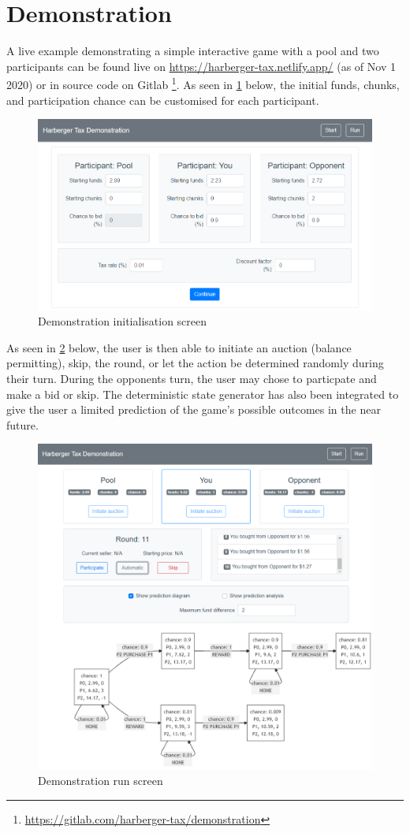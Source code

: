 \section{Demonstration} \label{section:demonstration}

A live example demonstrating a simple interactive game with a pool and two participants can be found live on \url{https://harberger-tax.netlify.app/} (as of Nov 1 2020) or in source code on Gitlab \footnote{\url{https://gitlab.com/harberger-tax/demonstration}}. As seen in \cref{figure:demonstration-start} below, the initial funds, chunks, and participation chance can be customised for each participant.

\begin{figure}[H]
  \centering
  \caption{Demonstration initialisation screen}
  \label{figure:demonstration-start}
  \includegraphics[width=\textwidth]{media/demonstration-start.PNG}
\end{figure}

As seen in \cref{figure:demonstration-run} below, the user is then able to initiate an auction (balance permitting), skip, the round, or let the action be determined randomly during their turn. During the opponents turn, the user may chose to particpate and make a bid or skip. The deterministic state generator has also been integrated to give the user a limited prediction of the game's possible outcomes in the near future.

\begin{figure}[H]
  \centering
  \caption{Demonstration run screen}
  \label{figure:demonstration-run}
  \includegraphics[width=\textwidth]{media/demonstration-run.PNG}
\end{figure}
